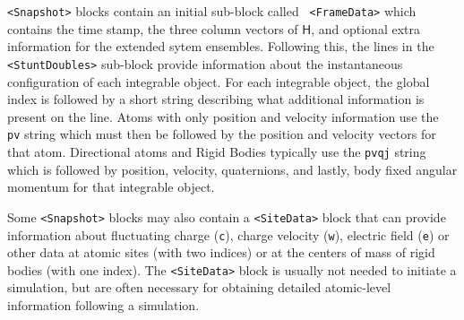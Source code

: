 \documentclass[letterpaper]{report}
\begin{document}
{\tt <Snapshot>} blocks contain an initial sub-block called {\tt
  <FrameData>} which contains the time stamp, the three column vectors
of $\mathsf{H}$, and optional extra information for the extended sytem
ensembles.  Following this, the lines in the {\tt <StuntDoubles>} sub-block provide
information about the instantaneous configuration of each integrable
object.  For each integrable object, the global index is followed by a
short string describing what additional information is present on the
line.  Atoms with only position and velocity information use the {\tt
  pv} string which must then be followed by the position and velocity
vectors for that atom.  Directional atoms and Rigid Bodies typically
use the {\tt pvqj} string which is followed by position, velocity,
quaternions, and lastly, body fixed angular momentum for that
integrable object.

Some {\tt <Snapshot>} blocks may also contain a {\tt <SiteData>} block
that can provide information about fluctuating charge ({\tt c}),
charge velocity ({\tt w}), electric field ({\tt e}) or other data at
atomic sites (with two indices) or at the centers of mass of rigid
bodies (with one index). The {\tt <SiteData>} block is usually not
needed to initiate a simulation, but are often necessary for obtaining
detailed atomic-level information following a simulation.
\end{document}
